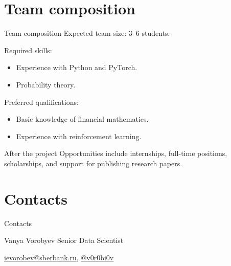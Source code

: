 \documentclass[10pt]{beamer}
\begin{document}
    \section{Team composition}
    \begin{frame}{Team composition}
        Expected team size: 3–6 students.
        
        Required skills:
        \begin{itemize}
            \item Experience with Python and PyTorch.
            \item Probability theory.
        \end{itemize}

        Preferred qualifications:
        \begin{itemize}
            \item Basic knowledge of financial mathematics.
            \item Experience with reinforcement learning.
        \end{itemize}

        \begin{block}{After the project}
            Opportunities include internships, full-time positions, scholarships, and support for publishing research papers.
        \end{block}
    \end{frame}

    \section{Contacts}
    \begin{frame}{Contacts}
        \begin{block}{Vanya Vorobyev}
            Senior Data Scientist
            
            \href{mailto:ievorobev@sberbank.ru}{ievorobev@sberbank.ru}, \href{https://t.me/v0r0bi0v}{@v0r0bi0v}
        \end{block}
    \end{frame}
\end{document}
